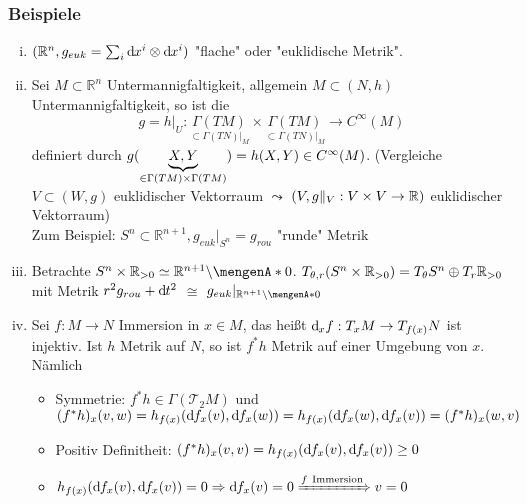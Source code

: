 \subsubsection{Beispiele}
\label{ssub:23}
\begin{enumerate}[(i)]
\item $(\mathbb{R}^n,g_{euk} = \sum_i \mathrm{d}\mkern-1.0mu x^i \otimes \mathrm{d}\mkern-1.0mu x^i)$ "flache" oder "euklidische Metrik".
\item Sei $M\subset \mathds{R}^n$ Untermannigfaltigkeit, allgemein $M\subset (N,h)$ Untermannigfaltigkeit, so ist die 
\[
g = h\vert_U :\underset{\subset \Gamma(TN)\vert_M}{\Gamma(TM)} \times \underset{\subset \Gamma(TN)\vert_M}{\Gamma(TM)} \to C^\infty (M)
\]
definiert durch $g(\underbrace{X,Y}_{\in \Gamma(TM)\times \Gamma(TM)}) = h(X,Y)\in C^\infty (M)$. (Vergleiche $V\subset (W,g)$ euklidischer Vektorraum $\leadsto$ $(V,g\Vert_V: V\times V \to \mathbb{R})$ euklidischer Vektorraum)\\
Zum Beispiel: $S^n \subset \mathds{R}^{n+1}, g_{euk}\vert_{S^n} = g_{rou}$ "runde" Metrik
\item Betrachte $S^n \times \mathds{R}_{>0} \simeq \mathds{R}^{n+1}\backslash \set{0}$. 
$T_{\theta,r} (S^n\times \mathbb{R}_{>0}) = T_\theta S^n \oplus T_r \mathbb{R}_{>0}$ mit Metrik $r^2 g_{rou} + \mathrm{d}\mkern-1.0mu t^2$ $\cong$ $g_{euk}\vert_{\mathds{R}^{n+1}\backslash \set{0}}$
\item Sei $f:M\to N$ Immersion in $x\in M$, das heißt $\mathrm{d}\mkern-1.0mu_x f: T_x M \to T_{f(x)} N$ ist injektiv. Ist $h$ Metrik auf $N$, so ist $f^* h$ Metrik auf einer Umgebung von $x$. Nämlich
\begin{itemize}
\item Symmetrie: $f^* h \in \Gamma(\mathcal{T}_2 M)$ und $(f^* h)_x (v,w) = h_{f(x)} (\mathrm{d}\mkern-1.0mu f_x (v),\mathrm{d}\mkern-1.0mu f_x (w)) = h_{f(x)} (\mathrm{d}\mkern-1.0mu f_x (w),\mathrm{d}\mkern-1.0mu f_x (v)) = (f^* h)_x (w,v)$
\item Positiv Definitheit: $(f^* h)_x (v,v) = h_{f(x)} (\mathrm{d}\mkern-1.0mu f_x (v),\mathrm{d}\mkern-1.0mu f_x (v)) \geq 0$
\item $h_{f(x)} \enbrace{\mathd f_x (v),\mathd f_x (v)} = 0 \Rightarrow \mathd f_x (v) = 0 \xRightarrow{f\ \text{Immersion}} v = 0$
\end{itemize}
\end{enumerate}

